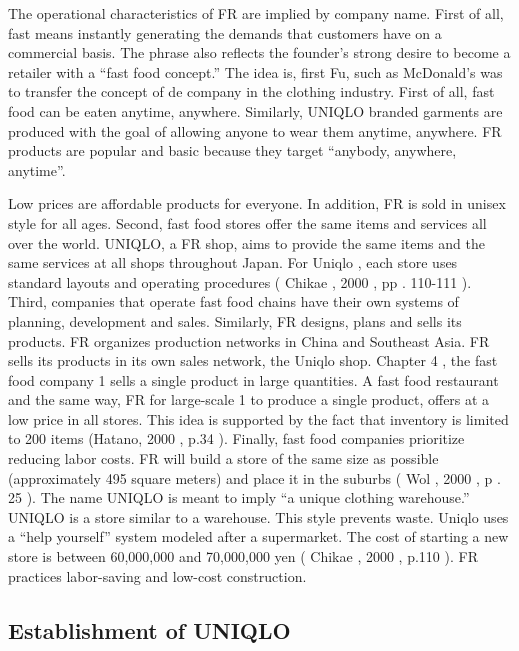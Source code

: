 \documentclass[12pt,]{article}
\begin{document}
The operational characteristics of FR are implied by company name. First
of all, fast means instantly generating the demands that customers have
on a commercial basis. The phrase also reflects the founder's strong
desire to become a retailer with a ``fast food concept.'' The idea is,
first Fu, such as McDonald's was to transfer the concept of de company
in the clothing industry. First of all, fast food can be eaten anytime,
anywhere. Similarly, UNIQLO branded garments are produced with the goal
of allowing anyone to wear them anytime, anywhere. FR products are
popular and basic because they target ``anybody, anywhere, anytime''.

Low prices are affordable products for everyone. In addition, FR is sold
in unisex style for all ages. Second, fast food stores offer the same
items and services all over the world. UNIQLO, a FR shop, aims to
provide the same items and the same services at all shops throughout
Japan. For Uniqlo , each store uses standard layouts and operating
procedures ( Chikae , 2000 , pp . 110-111 ). Third, companies that
operate fast food chains have their own systems of planning, development
and sales. Similarly, FR designs, plans and sells its products. FR
organizes production networks in China and Southeast Asia. FR sells its
products in its own sales network, the Uniqlo shop. Chapter 4 , the fast
food company 1 sells a single product in large quantities. A fast food
restaurant and the same way, FR for large-scale 1 to produce a single
product, offers at a low price in all stores. This idea is supported by
the fact that inventory is limited to 200 items (Hatano, 2000 , p.34 ).
Finally, fast food companies prioritize reducing labor costs. FR will
build a store of the same size as possible (approximately 495 square
meters) and place it in the suburbs ( Wol , 2000 , p . 25 ). The name
UNIQLO is meant to imply ``a unique clothing warehouse.'' UNIQLO is a
store similar to a warehouse. This style prevents waste. Uniqlo uses a
``help yourself'' system modeled after a supermarket. The cost of
starting a new store is between 60,000,000 and 70,000,000 yen ( Chikae ,
2000 , p.110 ). FR practices labor-saving and low-cost construction.

\hypertarget{establishment-of-uniqlo}{%
\subsection{Establishment of UNIQLO}\label{establishment-of-uniqlo}}
\end{document}
